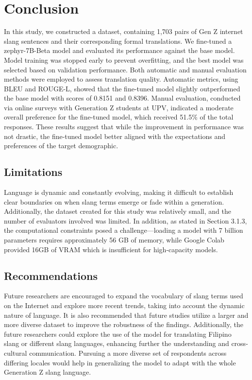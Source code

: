 \chapter{Conclusion}
In this study, we constructed a dataset, containing 1,703 pairs of Gen Z internet slang sentences and their corresponding formal translations. We fine-tuned a zephyr-7B-Beta model and  evaluated its performance against the base model. Model training was stopped early to prevent overfitting, and the best model was selected based on validation performance. Both automatic and manual evaluation methods were employed to assess translation quality. Automatic metrics, using BLEU and ROUGE-L, showed that the fine-tuned model slightly outperformed the base model with scores of 0.8151 and 0.8396. Manual evaluation, conducted via online surveys with Generation Z students at UPV, indicated a moderate overall preference for the fine-tuned model, which received 51.5\% of the total responses. These	 results suggest that while the improvement in performance was not drastic, the fine-tuned model better aligned with the expectations and preferences of the target demographic.

\section{Limitations}
Language is dynamic and constantly evolving, making it difficult to establish clear boundaries on when slang terms emerge or fade within a generation. Additionally, the dataset created for this study was relatively small, and the number of evaluators involved was limited. In addition, as stated in Section 3.1.3, the computational constraints posed a challenge—loading a model with 7 billion parameters requires approximately 56 GB of memory, while Google Colab provided 16GB of VRAM which is insufficient for high-capacity models.

\section{Recommendations}
Future researchers are encouraged to expand the vocabulary of slang terms used on the Internet and explore more recent trends, taking into account the dynamic nature of language. It is also recommended that future studies utilize a larger and more diverse dataset to improve the robustness of the findings. Additionally, the future researchers could explore the use of the model for translating Filipino slang or different slang languages, enhancing further the understanding and cross-cultural communication. Pursuing a more diverse set of respondents across differing locales would help in generalizing the model to adapt with the whole Generation Z slang language.